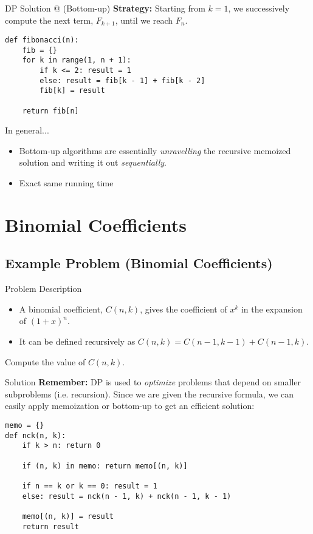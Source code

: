 \documentclass{beamer}
\makeatletter
\newcommand*{\rom}[1]{\expandafter\@slowromancap\romannumeral #1@}
\makeatother
\begin{document}
\begin{frame}[fragile]{DP Solution \rom{2} (Bottom-up)}
    \textbf{Strategy:} Starting from $k=1$, we successively compute the next term, $F_{k+1}$, until we reach $F_n$.
\begin{center}
\begin{lstlisting}[language=iPython, mathescape=true]
def fibonacci(n):
    fib = {}
    for k in range(1, n + 1):
        if k <= 2: result = 1
        else: result = fib[k - 1] + fib[k - 2]
        fib[k] = result
    
    return fib[n]
\end{lstlisting}
\end{center}
\end{frame}

\begin{frame}{In general...}
    \begin{itemize}
        \item Bottom-up algorithms are essentially \textit{unravelling} the recursive memoized solution and writing it out \textit{sequentially}.
        \item Exact same running time
    \end{itemize}
\end{frame}

\section{Binomial Coefficients}
\subsection{Example Problem (Binomial Coefficients)}
\begin{frame}{Problem Description}
    \begin{itemize}
        \item A binomial coefficient, $C(n,k)$, gives the coefficient of $x^k$ in the expansion of $(1+x)^n$.
        \item It can be defined recursively as $C(n,k)=C(n-1,k-1)+C(n-1,k)$.
    \end{itemize}
    
    Compute the value of $C(n,k)$.
\end{frame}

\begin{frame}[fragile]{Solution}
    \textbf{Remember:} DP is used to \textit{optimize} problems that depend on smaller subproblems (i.e. recursion).
    Since we are given the recursive formula, we can easily apply memoization or bottom-up to get an efficient solution:
\begin{lstlisting}[language=iPython, mathescape=true]
memo = {}
def nck(n, k):
    if k > n: return 0
    
    if (n, k) in memo: return memo[(n, k)]
   
    if n == k or k == 0: result = 1
    else: result = nck(n - 1, k) + nck(n - 1, k - 1)
    
    memo[(n, k)] = result
    return result
\end{lstlisting}
\end{frame}
\end{document}
